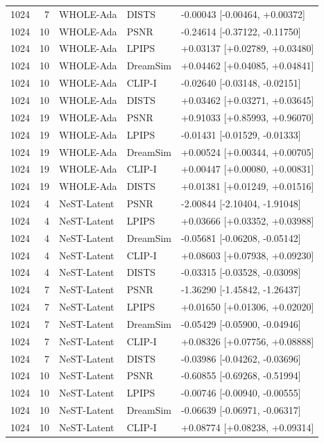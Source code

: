 \documentclass[10pt,letterpaper]{article}
\begin{document}
\begin{longtable}{@{}rrlll@{}}
1024 & 7 & WHOLE-Ada & DISTS & -0.00043 [-0.00464, +0.00372]\\
1024 & 10 & WHOLE-Ada & PSNR & -0.24614 [-0.37122, -0.11750]\\
1024 & 10 & WHOLE-Ada & LPIPS & +0.03137 [+0.02789, +0.03480]\\
1024 & 10 & WHOLE-Ada & DreamSim & +0.04462 [+0.04085, +0.04841]\\
1024 & 10 & WHOLE-Ada & CLIP-I & -0.02640 [-0.03148, -0.02151]\\
1024 & 10 & WHOLE-Ada & DISTS & +0.03462 [+0.03271, +0.03645]\\
1024 & 19 & WHOLE-Ada & PSNR & +0.91033 [+0.85993, +0.96070]\\
1024 & 19 & WHOLE-Ada & LPIPS & -0.01431 [-0.01529, -0.01333]\\
1024 & 19 & WHOLE-Ada & DreamSim & +0.00524 [+0.00344, +0.00705]\\
1024 & 19 & WHOLE-Ada & CLIP-I & +0.00447 [+0.00080, +0.00831]\\
1024 & 19 & WHOLE-Ada & DISTS & +0.01381 [+0.01249, +0.01516]\\
1024 & 4 & NeST-Latent & PSNR & -2.00844 [-2.10404, -1.91048]\\
1024 & 4 & NeST-Latent & LPIPS & +0.03666 [+0.03352, +0.03988]\\
1024 & 4 & NeST-Latent & DreamSim & -0.05681 [-0.06208, -0.05142]\\
1024 & 4 & NeST-Latent & CLIP-I & +0.08603 [+0.07938, +0.09230]\\
1024 & 4 & NeST-Latent & DISTS & -0.03315 [-0.03528, -0.03098]\\
1024 & 7 & NeST-Latent & PSNR & -1.36290 [-1.45842, -1.26437]\\
1024 & 7 & NeST-Latent & LPIPS & +0.01650 [+0.01306, +0.02020]\\
1024 & 7 & NeST-Latent & DreamSim & -0.05429 [-0.05900, -0.04946]\\
1024 & 7 & NeST-Latent & CLIP-I & +0.08326 [+0.07756, +0.08888]\\
1024 & 7 & NeST-Latent & DISTS & -0.03986 [-0.04262, -0.03696]\\
1024 & 10 & NeST-Latent & PSNR & -0.60855 [-0.69268, -0.51994]\\
1024 & 10 & NeST-Latent & LPIPS & -0.00746 [-0.00940, -0.00555]\\
1024 & 10 & NeST-Latent & DreamSim & -0.06639 [-0.06971, -0.06317]\\
1024 & 10 & NeST-Latent & CLIP-I & +0.08774 [+0.08238, +0.09314]\\

\end{longtable}
\end{document}
